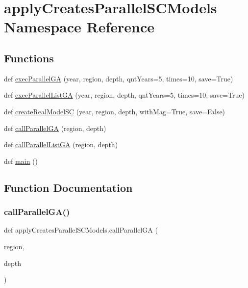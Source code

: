 \hypertarget{namespaceapply_creates_parallel_s_c_models}{}\section{apply\+Creates\+Parallel\+S\+C\+Models Namespace Reference}
\label{namespaceapply_creates_parallel_s_c_models}
\subsection*{Functions}
\begin{DoxyCompactItemize}
\item 
def \hyperlink{namespaceapply_creates_parallel_s_c_models_a73b756dca0cad3be956ad0396c73d9c7}{exec\+Parallel\+GA} (year, region, depth, qnt\+Years=5, times=10, save=True)
\item 
def \hyperlink{namespaceapply_creates_parallel_s_c_models_ac38a792ad866daa58851372e337ecdcb}{exec\+Parallel\+List\+GA} (year, region, depth, qnt\+Years=5, times=10, save=True)
\item 
def \hyperlink{namespaceapply_creates_parallel_s_c_models_a88cc12e7976c17d0a8aa2ff7c8a34d31}{create\+Real\+Model\+SC} (year, region, depth, with\+Mag=True, save=False)
\item 
def \hyperlink{namespaceapply_creates_parallel_s_c_models_a1c805d0e1fd5c5c18b8483aacad00705}{call\+Parallel\+GA} (region, depth)
\item 
def \hyperlink{namespaceapply_creates_parallel_s_c_models_a166eeee0a5ca5050af7cb56cbc310a1d}{call\+Parallel\+List\+GA} (region, depth)
\item 
def \hyperlink{namespaceapply_creates_parallel_s_c_models_a46f86c56143b54d6ff54f2cf729eb760}{main} ()
\end{DoxyCompactItemize}


\subsection{Function Documentation}
\mbox{\label{namespaceapply_creates_parallel_s_c_models_a1c805d0e1fd5c5c18b8483aacad00705}} 
\subsubsection{\texorpdfstring{call\+Parallel\+G\+A()}{callParallelGA()}}
{\footnotesize\ttfamily def apply\+Creates\+Parallel\+S\+C\+Models.\+call\+Parallel\+GA (\begin{DoxyParamCaption}\item[{}]{region,  }\item[{}]{depth }\end{DoxyParamCaption})}

